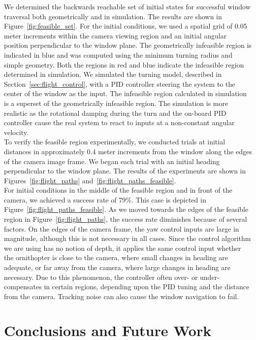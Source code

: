 \documentclass{aamas2013}
\begin{document}
We determined the backwards reachable set of initial states for successful
window traversal both geometrically and in simulation. The results are shown
in Figure~\ref{fig:feasible_set}. For the initial conditions, we used a
spatial grid of 0.05 meter increments within the camera viewing region and an
initial angular position perpendicular to the window plane. The geometrically
infeasible region is indicated in blue and was computed using the minimum
turning radius and simple geometry. Both the regions in red and blue indicate
the infeasible region determined in simulation. We simulated the turning
model, described in Section~\ref{sec:flight_control}, with a PID controller
steering the system to the center of the window as the input. The infeasible
region calculated in simulation is a superset of the geometrically infeasible
region. The simulation is more realistic as the rotational damping during the
turn and the on-board PID controller cause the real system to react to inputs
at a non-constant angular velocity.
\\
To verify the feasible region experimentally, we conducted trials at initial
distances in approximately 0.4 meter increments from the window along the
edges of the camera image frame. We began each trial with an initial heading
perpendicular to the window plane. The results of the experiments are shown in
Figures~\ref{fig:flight_paths} and~\ref{fig:flight_paths_feasible}.
\\
For initial conditions in the middle of the feasible region and in front of
the camera, we achieved a success rate of 79\%. This case is depicted in
Figure~\ref{fig:flight_paths_feasible}. As we moved towards the edges of the
feasible region in Figure~\ref{fig:flight_paths}, the success rate diminishes
because of several factors. On the edges of the camera frame, the yaw control
inputs are large in magnitude, although this is not necessary in all cases.
Since the control algorithm we are using has no notion of depth, it applies
the same control input whether the ornithopter is close to the camera, where
small changes in heading are adequate, or far away from the camera, where
large changes in heading are necessary. Due to this phenomenon, the controller
often over- or under-compensates in certain regions, depending upon the PID
tuning and the distance from the camera. Tracking noise can also cause the
window navigation to fail.

\section{Conclusions and Future Work}
\end{document}
